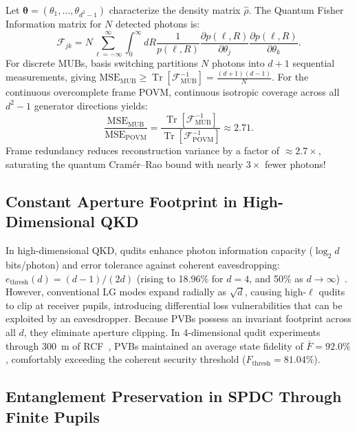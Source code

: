 \documentclass[11pt,a4paper]{article}
\begin{document}
Let $\boldsymbol{\theta} = (\theta_1, \dots, \theta_{d^2-1})$ characterize the density matrix $\hat{\rho}$. The Quantum Fisher Information matrix for $N$ detected photons is:
\begin{equation}
\mathcal{F}_{jk} = N \sum_{\ell=-\infty}^\infty \int_0^\infty dR \frac{1}{p(\ell, R)} \frac{\partial p(\ell, R)}{\partial \theta_j} \frac{\partial p(\ell, R)}{\partial \theta_k}.
\label{eq:fisher_matrix_def}
\end{equation}
For discrete MUBs, basis switching partitions $N$ photons into $d+1$ sequential measurements, giving $\text{MSE}_{\text{MUB}} \ge \operatorname{Tr}[\mathcal{F}_{\text{MUB}}^{-1}] = \frac{(d+1)(d-1)}{N}$. For the continuous overcomplete frame POVM, continuous isotropic coverage across all $d^2-1$ generator directions yields:
\begin{equation}
\boxed{\frac{\text{MSE}_{\text{MUB}}}{\text{MSE}_{\text{POVM}}} = \frac{\operatorname{Tr}[\mathcal{F}_{\text{MUB}}^{-1}]}{\operatorname{Tr}[\mathcal{F}_{\text{POVM}}^{-1}]} \approx \mathbf{2.71}.}
\label{eq:cramer_rao_advantage}
\end{equation}
Frame redundancy reduces reconstruction variance by a factor of $\approx 2.7\times$, saturating the quantum Cramér--Rao bound with nearly $3\times$ fewer photons!

\subsection{Constant Aperture Footprint in High-Dimensional QKD}

In high-dimensional QKD, qudits enhance photon information capacity ($\log_2 d$ bits/photon) and error tolerance against coherent eavesdropping: $e_{\text{thresh}}(d) = (d-1)/(2d)$ (rising to 18.96\% for $d=4$, and 50\% as $d \to \infty$)~\cite{Cerf2002,Mirhosseini2015,BennettBrassard1984}. However, conventional LG modes expand radially as $\sqrt{d}$, causing high-$\ell$ qudits to clip at receiver pupils, introducing differential loss vulnerabilities that can be exploited by an eavesdropper. Because PVBs possess an invariant footprint across all $d$, they eliminate aperture clipping. In 4-dimensional qudit experiments through 300~m of RCF~\cite{Villalba2023}, PVBs maintained an average state fidelity of $\bar{F} = 92.0\%$, comfortably exceeding the coherent security threshold ($F_{\text{thresh}} = 81.04\%$).

\subsection{Entanglement Preservation in SPDC Through Finite Pupils}
\end{document}
